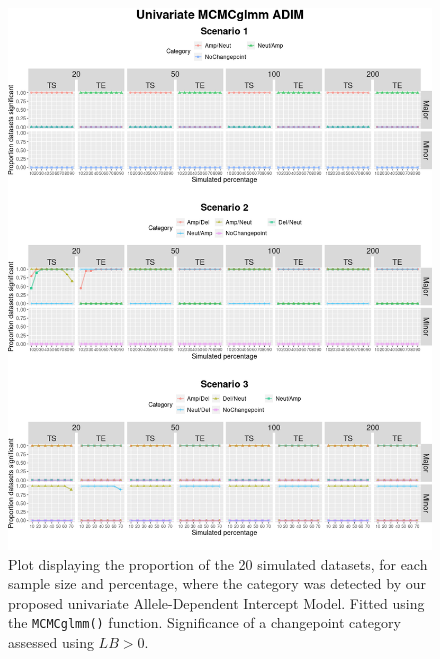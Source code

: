 \begin{figure}[!htb]
\center
\includegraphics[width = 1\textwidth]{../figures/Chapter_5/MCMC_uni_sim_plot.png}
\caption[Plot displaying the proportion of the 20 simulated datasets, for each sample size and percentage, where the category was detected by our proposed univariate Allele-Dependent Intercept Model (\texttt{MCMCglmm()}).]{Plot displaying the proportion of the 20 simulated datasets, for each sample size and percentage, where the category was detected by our proposed univariate Allele-Dependent Intercept Model. Fitted using the \texttt{MCMCglmm()} function. Significance of a changepoint category assessed using $LB > 0$.}
\label{fig:Uni_mcmc_SimStudy}
\end{figure}
\vfill 

\clearpage

